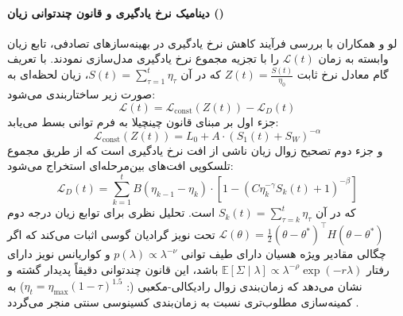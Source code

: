 \paragraph*{دینامیک نرخ یادگیری و قانون چندتوانی زیان ()}
لو و همکاران \cite{luo2025multipower} با بررسی فرآیند کاهش نرخ یادگیری در بهینه‌سازهای تصادفی، تابع زیان وابسته به زمان $\mathcal{L}(t)$ را با تجزیه مجموع نرخ یادگیری مدل‌سازی نمودند. با تعریف گام معادل نرخ ثابت $Z(t) = \frac{S(t)}{\eta_0}$ که در آن $S(t) = \sum_{\tau=1}^t \eta_\tau$، زیان لحظه‌ای به صورت زیر ساختاربندی می‌شود:
\begin{equation}
    \mathcal{L}(t) = \mathcal{L}_{\text{const}}(Z(t)) - \mathcal{L}_D(t)
\end{equation}
جزء اول بر مبنای قانون چینچیلا به فرم توانی بسط می‌یابد:
\begin{equation}
    \mathcal{L}_{\text{const}}(Z(t)) = L_0 + A \cdot (S_1(t) + S_W)^{-\alpha}
\end{equation}
و جزء دوم تصحیح زوال زیان ناشی از افت نرخ یادگیری است که از طریق مجموع تلسکوپی افت‌های بین‌مرحله‌ای استخراج می‌شود:
\begin{equation}
    \mathcal{L}_D(t) = \sum_{k=1}^t B(\eta_{k-1} - \eta_k) \cdot \left[ 1 - \left( C \eta_k^{-\gamma} S_k(t) + 1 \right)^{-\beta} \right]
\end{equation}
که در آن $S_k(t) = \sum_{\tau=k}^t \eta_\tau$ است. تحلیل نظری برای توابع زیان درجه دوم $\mathcal{L}(\theta) = \frac{1}{2}(\theta - \theta^*)^\top H (\theta - \theta^*)$ تحت نویز گرادیان گوسی اثبات می‌کند که اگر چگالی مقادیر ویژه هسیان دارای طیف توانی $p(\lambda) \propto \lambda^{-\nu}$ و کواریانس نویز دارای رفتار $\mathbb{E}[\Sigma \mid \lambda] \propto \lambda^{-\rho}\exp(-r\lambda)$ باشد، این قانون چندتوانی دقیقاً پدیدار گشته و نشان می‌دهد که زمان‌بندی زوال رادیکالی-مکعبی (: $\eta_t = \eta_{\max}(1 - \tau)^{1.5}$) به کمینه‌سازی مطلوب‌تری نسبت به زمان‌بندی کسینوسی سنتی منجر می‌گردد \cite{luo2025multipower}.

